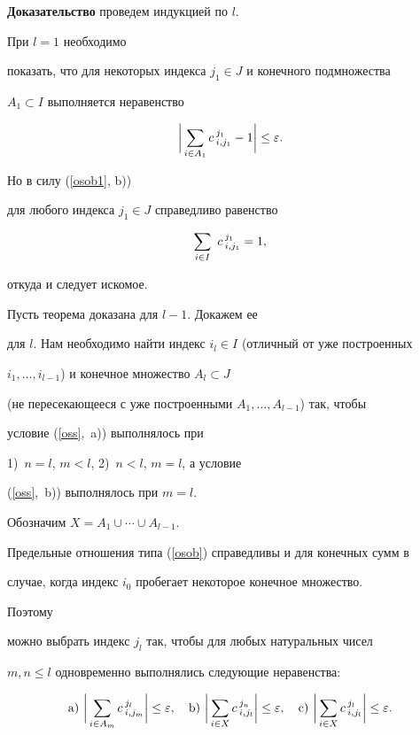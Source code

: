 {\bf Доказательство} проведем индукцией по $l$.





При $l=1$ необходимо


показать, что для некоторых индекса $j_1 \in J$ и конечного подмножества


$A_1 \subset I$ выполняется неравенство


$$


\bigg | \sum_{i \in A_1} c\,^{j_1}_{i,j_1} -1\bigg | \le \ep.


$$


Но в силу (\ref{osob1}, b))


для любого индекса $j_1 \in J$ справедливо равенство


$$


\sumi \,\, c\,^{j_1}_{i,j_1}=1,


$$


откуда и следует искомое.





Пусть теорема доказана для $l-1$. Докажем ее


для $l$. Нам необходимо найти индекс $i_l \in I$ (отличный от уже построенных


$i_1,\dotsc,i_{l-1}$) и конечное множество $A_l \subset J$


(не пересекающееся с уже построенными $A_1,\dotsc,A_{l-1}$) так, чтобы


условие (\ref{oss},~a)) выполнялось при


1)~$n=l$, $m<l$, 2)~$n <l$, $m=l$, а условие


(\ref{oss},~b)) выполнялось при $m=l$.


Обозначим $X=A_1 \cup\dotsb\cup A_{l-1}$.





Предельные отношения типа (\ref{osob}) справедливы и для конечных сумм в


случае, когда индекс $i_0$ пробегает некоторое конечное множество.


Поэтому


можно выбрать индекс $j_l$ так, чтобы для любых натуральных чисел


$m,n \le l$ одновременно выполнялись следующие неравенства:


\begin{equation}


\label{oss2}


\mathrm a)\ \bigg | \sum_{i \in A_m} c\,^{j_l}_{i,j_m} \bigg | \le \ep, \quad


\mathrm b)\ \bigg | \sum_{i \in X} c\,^{j_n}_{i,j_l} \bigg | \le \ep, \quad


\mathrm c)\ \bigg | \sum_{i \in X} c\,^{j_l}_{i,j_l} \bigg | \le \ep.


\end {equation}


